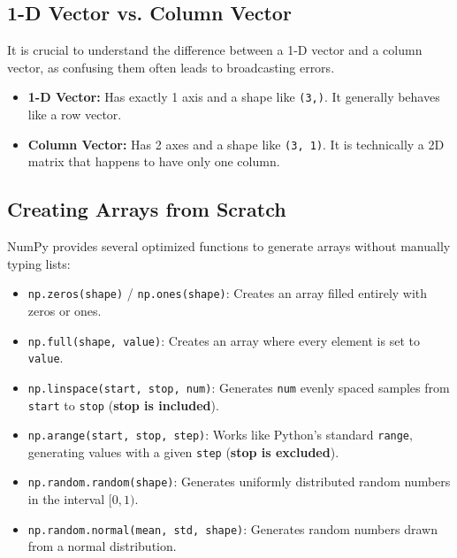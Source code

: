 \subsection{1-D Vector vs. Column Vector}
It is crucial to understand the difference between a 1-D vector and a column vector, as confusing them often leads to broadcasting errors.
\begin{itemize}
    \item \textbf{1-D Vector:} Has exactly 1 axis and a shape like \texttt{(3,)}. It generally behaves like a row vector.
    \item \textbf{Column Vector:} Has 2 axes and a shape like \texttt{(3, 1)}. It is technically a 2D matrix that happens to have only one column.
\end{itemize}





\subsection{Creating Arrays from Scratch}
NumPy provides several optimized functions to generate arrays without manually typing lists:
\begin{itemize}
    \item \texttt{np.zeros(shape)} / \texttt{np.ones(shape)}: Creates an array filled entirely with zeros or ones.
    \item \texttt{np.full(shape, value)}: Creates an array where every element is set to \texttt{value}.
    \item \texttt{np.linspace(start, stop, num)}: Generates \texttt{num} evenly spaced samples from \texttt{start} to \texttt{stop} (\textbf{stop is included}).
    \item \texttt{np.arange(start, stop, step)}: Works like Python's standard \texttt{range}, generating values with a given \texttt{step} (\textbf{stop is excluded}).
    \item \texttt{np.random.random(shape)}: Generates uniformly distributed random numbers in the interval $[0, 1)$.
    \item \texttt{np.random.normal(mean, std, shape)}: Generates random numbers drawn from a normal distribution.
\end{itemize}




